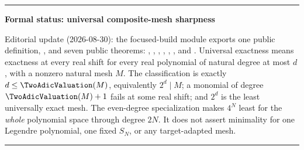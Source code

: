 \documentclass[11pt,oneside]{article}
\numberwithin{equation}{section}
\theoremstyle{definition}
\theoremstyle{remark}
\newenvironment{statusbox}[1]{%
  \par\smallskip\noindent\begin{center}\begin{minipage}{0.94\textwidth}%
  \hrule\vspace{0.55em}\noindent\textbf{#1}\par\smallskip
}{%
  \vspace{0.55em}\hrule\end{minipage}\end{center}\smallskip
}
\begin{document}
\begin{statusbox}{Formal status: universal composite-mesh sharpness}
Editorial update (2026-08-30): the focused-build module
 exports one public definition,
, and seven public theorems:
,
,
,
,
,
, and
.  Universal exactness means
exactness at every real shift for every real polynomial of natural degree at
most \(d\), with a nonzero natural mesh \(M\).  The classification is exactly
\(d\le\TwoAdicValuation(M)\), equivalently \(2^d\mid M\); a monomial of degree
\(\TwoAdicValuation(M)+1\) fails at some real shift; and \(2^d\) is the least universally
exact mesh.  The even-degree specialization makes \(4^N\) least for the
\emph{whole} polynomial space through degree \(2N\).  It does not assert
minimality for one Legendre polynomial, one fixed \(S_N\), or any
target-adapted mesh.
\end{statusbox}
\end{document}
